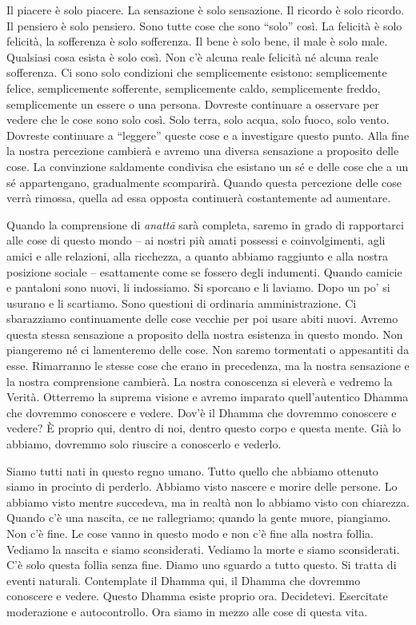 Il piacere è solo piacere. La sensazione è solo sensazione. Il ricordo è
solo ricordo. Il pensiero è solo pensiero. Sono tutte cose che sono
``solo'' così. La felicità è solo felicità, la sofferenza è solo
sofferenza. Il bene è solo bene, il male è solo male. Qualsiasi cosa
esista è solo così. Non c'è alcuna reale felicità né alcuna reale
sofferenza. Ci sono solo condizioni che semplicemente esistono:
semplicemente felice, semplicemente sofferente, semplicemente caldo,
semplicemente freddo, semplicemente un essere o una persona. Dovreste
continuare a osservare per vedere che le cose sono solo così. Solo
terra, solo acqua, solo fuoco, solo vento. Dovreste continuare a
``leggere'' queste cose e a investigare questo punto. Alla fine la
nostra percezione cambierà e avremo una diversa sensazione a proposito
delle cose. La convinzione saldamente condivisa che esistano un sé e
delle cose che a un sé appartengano, gradualmente scomparirà. Quando
questa percezione delle cose verrà rimossa, quella ad essa opposta
continuerà costantemente ad aumentare.

Quando la comprensione di \emph{anattā} sarà completa, saremo in grado
di rapportarci alle cose di questo mondo -- ai nostri più amati possessi
e coinvolgimenti, agli amici e alle relazioni, alla ricchezza, a quanto
abbiamo raggiunto e alla nostra posizione sociale -- esattamente come se
fossero degli indumenti. Quando camicie e pantaloni sono nuovi, li
indossiamo. Si sporcano e li laviamo. Dopo un po' si usurano e li
scartiamo. Sono questioni di ordinaria amministrazione. Ci sbarazziamo
continuamente delle cose vecchie per poi usare abiti nuovi. Avremo
questa stessa sensazione a proposito della nostra esistenza in questo
mondo. Non piangeremo né ci lamenteremo delle cose. Non saremo
tormentati o appesantiti da esse. Rimarranno le stesse cose che erano in
precedenza, ma la nostra sensazione e la nostra comprensione cambierà.
La nostra conoscenza si eleverà e vedremo la Verità. Otterremo la
suprema visione e avremo imparato quell'autentico Dhamma che dovremmo
conoscere e vedere. Dov'è il Dhamma che dovremmo conoscere e vedere? È
proprio qui, dentro di noi, dentro questo corpo e questa mente. Già lo
abbiamo, dovremmo solo riuscire a conoscerlo e vederlo.

Siamo tutti nati in questo regno umano. Tutto quello che abbiamo
ottenuto siamo in procinto di perderlo. Abbiamo visto nascere e morire
delle persone. Lo abbiamo visto mentre succedeva, ma in realtà non lo
abbiamo visto con chiarezza. Quando c'è una nascita, ce ne rallegriamo;
quando la gente muore, piangiamo. Non c'è fine. Le cose vanno in questo
modo e non c'è fine alla nostra follia. Vediamo la nascita e siamo
sconsiderati. Vediamo la morte e siamo sconsiderati. C'è solo questa
follia senza fine. Diamo uno sguardo a tutto questo. Si tratta di eventi
naturali. Contemplate il Dhamma qui, il Dhamma che dovremmo conoscere e
vedere. Questo Dhamma esiste proprio ora. Decidetevi. Esercitate
moderazione e autocontrollo. Ora siamo in mezzo alle cose di questa
vita.

